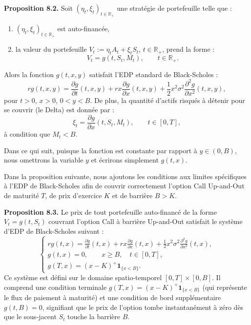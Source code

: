 \documentclass[11pt]{article}
\begin{document}
\textbf{Proposition 8.2.} Soit $(\eta_t, \xi_t)_{t \in \mathbb{R}_+}$ une stratégie de portefeuille telle que :
\begin{enumerate}
    \item[(i)] $(\eta_t, \xi_t)_{t \in \mathbb{R}_+}$ est auto-financée,
    \item[(ii)] la valeur du portefeuille $V_t := \eta_t A_t + \xi_t S_t$, $t \in \mathbb{R}_+$, prend la forme :
    \begin{equation*}
    V_t = g(t, S_t, M_t), \qquad t \in \mathbb{R}_+.
    \end{equation*}
\end{enumerate}

Alors la fonction $g(t, x, y)$ satisfait l'EDP standard de Black-Scholes :
\begin{equation}
r g(t, x, y) = \frac{\partial g}{\partial t}(t, x, y) + r x \frac{\partial g}{\partial x}(t, x, y) + \frac{1}{2} x^2 \sigma^2 \frac{\partial^2 g}{\partial x^2}(t, x, y),
\end{equation}
pour $t > 0$, $x > 0$, $0 < y < B$. De plus, la quantité d'actifs risqués à détenir pour se couvrir (le Delta) est donnée par :
\begin{equation}
\xi_t = \frac{\partial g}{\partial x}(t, S_t, M_t), \qquad t \in [0, T],
\end{equation}
à condition que $M_t < B$.

Dans ce qui suit, puisque la fonction est constante par rapport à $y \in (0, B)$, nous omettrons la variable $y$ et écrirons simplement $g(t, x)$.

Dans la proposition suivante, nous ajoutons les conditions aux limites spécifiques à l'EDP de Black-Scholes afin de couvrir correctement l'option Call Up-and-Out de maturité $T$, de prix d'exercice $K$ et de barrière $B > K$.

\textbf{Proposition 8.3.} Le prix de tout portefeuille auto-financé de la forme $V_t = g(t, S_t)$ couvrant l'option Call à barrière Up-and-Out satisfait le système d'EDP de Black-Scholes suivant :
\begin{equation}
\begin{cases}
r g(t, x) = \frac{\partial g}{\partial t}(t, x) + r x \frac{\partial g}{\partial x}(t, x) + \frac{1}{2} x^2 \sigma^2 \frac{\partial^2 g}{\partial x^2}(t, x), \\[8pt]
g(t, x) = 0, \qquad x \ge B, \quad t \in [0, T], \\[8pt]
g(T, x) = (x - K)^+ \mathbf{1}_{\{x < B\}}.
\end{cases}
\end{equation}
Ce système est défini sur le domaine spatio-temporel $[0, T] \times [0, B]$. Il comprend une condition terminale $g(T, x) = (x - K)^+ \mathbf{1}_{\{x < B\}}$ (qui représente le flux de paiement à maturité) et une condition de bord supplémentaire $g(t, B) = 0$, signifiant que le prix de l'option tombe instantanément à zéro dès que le sous-jacent $S_t$ touche la barrière $B$.
\end{document}
